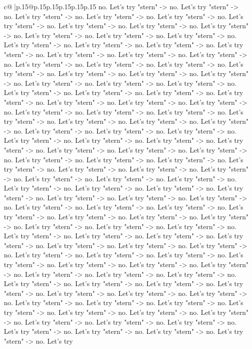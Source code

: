 \documentclass{article}
\begin{document}
{\begin{supertabular}{c@{$\;$}|p{.15\linewidth}@{}p{.15\linewidth}p{.15\linewidth}p{.15\linewidth}p{.15\linewidth}p{.15\linewidth}}
{{{no. Let's try "stern" {-}> no. Let's try "stern" {-}> no. Let's try "stern" {-}> no. Let's try "stern" {-}> no. Let's try "stern" {-}> no. Let's try "stern" {-}> no. Let's try "stern" {-}> no. Let's try "stern" {-}> no. Let's try "stern" {-}> no. Let's try "stern" {-}> no. Let's try "stern" {-}> no. Let's try "stern" {-}> no. Let's try "stern" {-}> no. Let's try "stern" {-}> no. Let's try "stern" {-}> no. Let's try "stern" {-}> no. Let's try "stern" {-}> no. Let's try "stern" {-}> no. Let's try "stern" {-}> no. Let's try "stern" {-}> no. Let's try "stern" {-}> no. Let's try "stern" {-}> no. Let's try "stern" {-}> no. Let's try "stern" {-}> no. Let's try "stern" {-}> no. Let's try "stern" {-}> no. Let's try "stern" {-}> no. Let's try "stern" {-}> no. Let's try "stern" {-}> no. Let's try "stern" {-}> no. Let's try "stern" {-}> no. Let's try "stern" {-}> no. Let's try "stern" {-}> no. Let's try "stern" {-}> no. Let's try "stern" {-}> no. Let's try "stern" {-}> no. Let's try "stern" {-}> no. Let's try "stern" {-}> no. Let's try "stern" {-}> no. Let's try "stern" {-}> no. Let's try "stern" {-}> no. Let's try "stern" {-}> no. Let's try "stern" {-}> no. Let's try "stern" {-}> no. Let's try "stern" {-}> no. Let's try "stern" {-}> no. Let's try "stern" {-}> no. Let's try "stern" {-}> no. Let's try "stern" {-}> no. Let's try "stern" {-}> no. Let's try "stern" {-}> no. Let's try "stern" {-}> no. Let's try "stern" {-}> no. Let's try "stern" {-}> no. Let's try "stern" {-}> no. Let's try "stern" {-}> no. Let's try "stern" {-}> no. Let's try "stern" {-}> no. Let's try "stern" {-}> no. Let's try "stern" {-}> no. Let's try "stern" {-}> no. Let's try "stern" {-}> no. Let's try "stern" {-}> no. Let's try "stern" {-}> no. Let's try "stern" {-}> no. Let's try "stern" {-}> no. Let's try "stern" {-}> no. Let's try "stern" {-}> no. Let's try "stern" {-}> no. Let's try "stern" {-}> no. Let's try "stern" {-}> no. Let's try "stern" {-}> no. Let's try "stern" {-}> no. Let's try "stern" {-}> no. Let's try "stern" {-}> no. Let's try "stern" {-}> no. Let's try "stern" {-}> no. Let's try "stern" {-}> no. Let's try "stern" {-}> no. Let's try "stern" {-}> no. Let's try "stern" {-}> no. Let's try "stern" {-}> no. Let's try "stern" {-}> no. Let's try "stern" {-}> no. Let's try "stern" {-}> no. Let's try "stern" {-}> no. Let's try "stern" {-}> no. Let's try "stern" {-}> no. Let's try "stern" {-}> no. Let's try "stern" {-}> no. Let's try "stern" {-}> no. Let's try "stern" {-}> no. Let's try "stern" {-}> no. Let's try "stern" {-}> no. Let's try "stern" {-}> no. Let's try "stern" {-}> no. Let's try "stern" {-}> no. Let's try "stern" {-}> no. Let's try "stern" {-}> no. Let's try "stern" {-}> no. Let's try "stern" {-}> no. Let's try "stern" {-}> no. Let's try "stern" {-}> no. Let's try "stern" {-}> no. Let's try "stern" {-}> no. Let's try "stern" {-}> no. Let's try "stern" {-}> no. Let's try "stern" {-}> no. Let's try "stern" {-}> no. Let's try "stern" {-}> no. Let's try "stern" {-}> no. Let's try "stern" {-}> no. Let's try "stern" {-}> no. Let's try "stern" {-}> no. Let's try "stern" {-}> no. Let's try "stern" {-}> no. Let's try "stern" {-}> no. Let's try "stern" {-}> no. Let's try }}}
\end{supertabular}}
\end{document}
